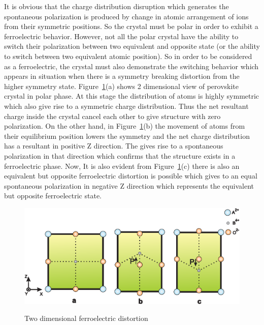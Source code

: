 It is obvious that the charge distribution disruption which generates the spontaneous polarization is produced by change in atomic arrangement of ions from their symmetric positions. So the crystal must be polar in order to exhibit a ferroelectric behavior. However, not all the polar crystal have the ability to switch their polarization between two equivalent and opposite state (or the ability to switch between two equivalent atomic position). So in order to be considered as a ferroelectric, the crystal must also demonstrate the switching behavior which appears in situation when there is a symmetry breaking distortion from the higher symmetry state. Figure~\ref{fig:Two dimensional ferroelectric distortion}(a) shows 2 dimensional view of perovskite crystal in polar phase. At this stage the distribution of atoms is highly symmetric which also give rise to a symmetric charge distribution. Thus the net resultant charge inside the crystal cancel each other to give structure with zero polarization. On the other hand, in Figure~\ref{fig:Two dimensional ferroelectric distortion}(b) the movement of atoms from their equilibrium position lowers the symmetry  and the net charge distribution has a resultant in positive Z direction. The gives rise to a spontaneous polarization in that direction which confirms that the structure exists in a ferroelectric phase. Now, It is also evident from Figure~\ref{fig:Two dimensional ferroelectric distortion}(c) there is also an equivalent but opposite ferroelectric distortion is possible which gives to an equal spontaneous polarization in negative Z direction  which represents the equivalent but opposite ferroelectric state.
\begin{figure}[t]
\centering
	\includegraphics[width=1.0\textwidth]{Perovskite2D.eps}\\
	\caption[Two dimensional ferroelectric distortion]{Two dimensional ferroelectric distortion}\label{fig:Two dimensional ferroelectric distortion}
\end{figure}
